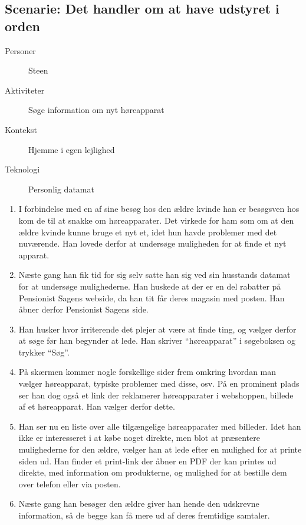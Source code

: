 \subsection{Scenarie: Det handler om at have udstyret i orden}
\begin{description}
    \item[Personer] Steen
    \item[Aktiviteter] Søge information om nyt høreapparat
    \item[Kontekst] Hjemme i egen lejlighed
    \item[Teknologi] Personlig datamat
\end{description}

\begin{enumerate}
    \item I forbindelse med en af sine besøg hos den ældre kvinde han er besøgsven hos kom de til at snakke om høreapparater. Det virkede for ham som om at den ældre kvinde kunne bruge et nyt et, idet hun havde problemer med det nuværende. Han lovede derfor at undersøge muligheden for at finde et nyt apparat.
    \item Næste gang han fik tid for sig selv satte han sig ved sin husstands datamat for at undersøge mulighederne. Han huskede at der er en del rabatter på Pensionist Sagens webside, da han tit får deres magasin med posten. Han åbner derfor Pensionist Sagens side.
    \item Han husker hvor irriterende det plejer at være at finde ting, og vælger derfor at søge før han begynder at lede. Han skriver ``høreapparat'' i søgeboksen og trykker ``Søg''.
    \item På skærmen kommer nogle forskellige sider frem omkring hvordan man vælger høreapparat, typiske problemer med disse, osv. På en prominent plads ser han dog også et link der reklamerer høreapparater i webshoppen, billede af et høreapparat. Han vælger derfor dette.
    \item Han ser nu en liste over alle tilgængelige høreapparater med billeder. Idet han ikke er interesseret i at købe noget direkte, men blot at præsentere mulighederne for den ældre, vælger han at lede efter en mulighed for at printe siden ud. Han finder et print-link der åbner en PDF der kan printes ud direkte, med information om produkterne, og mulighed for at bestille dem over telefon eller via posten.
    \item Næste gang han besøger den ældre giver han hende den udskrevne information, så de begge kan få mere ud af deres fremtidige samtaler.
\end{enumerate}
